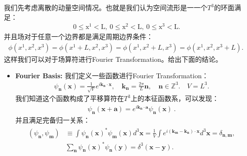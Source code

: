 我们先考虑离散的动量空间情况。也就是我们认为空间流形是一一个$ T^3 $的环面满足：
\begin{align}
  \mathrm{~0\leq x^1<L,~0\leq x^2<L,~0\leq x^3<L.}
\end{align}
并且场对于任意一个边界都是满足周期边界条件：
\begin{align}
  \phi(x^1,x^2,x^3)=\phi(x^1+L,x^2,x^3)=\phi(x^1,x^2+L,x^3)=\phi(x^1,x^2,x^3+L).
\end{align}
这样我们可以对于场算符进行Fourier Transformation。给出下面的结论。
\begin{itemize}
  \item \textbf{Fourier Basis:} 我们定义一些函数进行Fourier Transformation：
    \begin{align}
      \psi_{\mathbf{n}}(\mathbf{x})=\frac{1}{\sqrt{V}}e^{i\mathbf{k_{n}}\cdot\mathbf{x}},
      \quad \mathbf{k_n}=\frac{2\pi}{L}\mathbf{n},\quad
      \mathbf{n}\in\mathbb{Z}^3. \quad V = L^3.
    \end{align}
    我们知道这个函数构成了平移算符在$ T^3 $上的本征函数系，可以发现：
    \begin{align}
      \psi_{\mathbf{n}}(\mathbf{x}+\mathbf{a})=e^{i\mathbf{k_{n}}\cdot\mathbf{a}}\psi_{\mathbf{n}}(\mathbf{x})\mathrm{~.}
    \end{align}
    并且满足完备归一关系：
    \begin{align}
      \begin{aligned}(\psi_{\mathbf{n}},\psi_{\mathbf{m}})&\equiv\int\psi_{\mathbf{n}}(\mathbf{x})^{*}\psi_{\mathbf{m}}(\mathbf{x})d^{3}\mathbf{x}=\frac{1}{V}\int
        e^{i(\mathbf{k_{m}}-\mathbf{k_{n}})\cdot\mathbf{x}}d^{3}\mathbf{x}=\delta_{\mathbf{n},\mathbf{m}},\\&\sum_{\mathbf{n}}\psi_{\mathbf{n}}(\mathbf{x})^{*}\psi_{\mathbf{n}}(\mathbf{y})=\delta^{3}(\mathbf{x}-\mathbf{y}).
      \end{aligned}
    \end{align}
\end{itemize}

